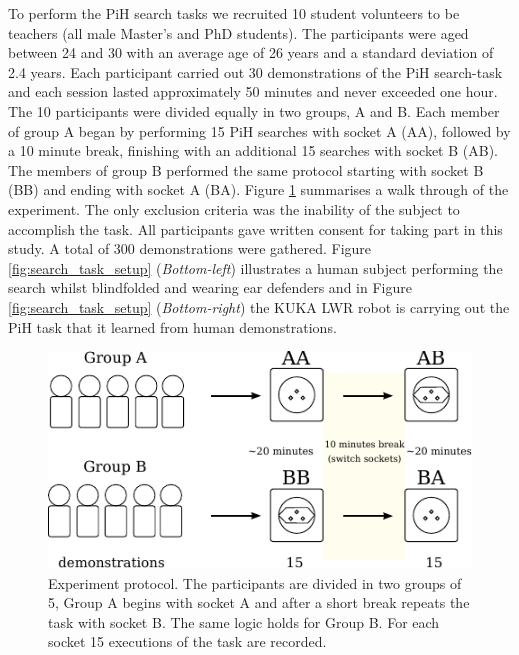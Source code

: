\documentclass[final,5p,times,twocolumn]{elsarticle}
\begin{document}
To perform the PiH search tasks we recruited 10 student volunteers to be teachers (all male Master's and PhD students).
The participants were aged between 24 and 30 with an average age of 26 years and a standard deviation of 2.4 years.
Each participant carried out 30 demonstrations of the PiH search-task and each session lasted approximately 50 minutes and 
never exceeded one hour. The 10 participants were divided equally in two groups, A and B. Each member of group A began 
by performing 15 PiH searches with socket A (AA), followed by a 10 minute break, finishing with an additional 15 searches with socket B (AB). 
The members of group B performed the same protocol starting with socket B (BB) and ending with socket A (BA).
Figure \ref{fig:experiment_design} summarises a walk through of the experiment.
The only exclusion criteria was the inability of the subject to accomplish the task. All participants gave written consent 
for taking part in this study. A total of 300 demonstrations were gathered. Figure \ref{fig:search_task_setup} (\textit{Bottom-left})
illustrates a human subject performing the search whilst blindfolded and wearing ear defenders and in Figure \ref{fig:search_task_setup} 
(\textit{Bottom-right}) the KUKA LWR robot is carrying out the PiH task that it learned from human demonstrations.

\begin{figure}[h]
\centering
 \includegraphics[width=0.9\linewidth]{./Figures/Fig/experiment_design_v2.pdf}
 \caption{Experiment protocol. The participants are divided in two groups of 5, Group A begins with socket A 
 and after a short break repeats the task with socket B. The same logic holds for Group B.
 For each socket 15 executions of the task are recorded.}
 \label{fig:experiment_design}
\end{figure}
\end{document}
